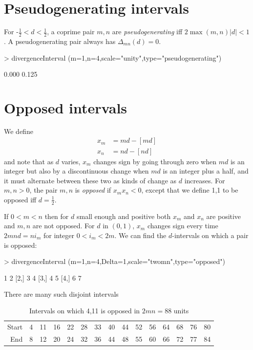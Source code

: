 \documentclass[a4paper]{article}
\newcommand{\half}{\textstyle{\frac{1}{2}}}
\begin{document}
\section{Pseudogenerating intervals}
For -$\half<d<\half$, a coprime pair $m,n$ are \emph{pseudogenerating} iff $2\max(m,n)|d|<1$. A pseudogenerating pair always has $\Delta_{mn}(d)=0$.
\begin{Schunk}
\begin{Sinput}
> divergenceInterval (m=1,n=4,scale="unity",type="pseudogenerating")
\end{Sinput}
\begin{Soutput}
[1] 0.000 0.125
\end{Soutput}
\end{Schunk}

\clearpage
\section{Opposed intervals}
We define
\begin{align*}
x_m &= m d - [ m d]
\\
x_n &= n d - [ n d ]
\end{align*}
and note that as $d$ varies, $x_m$ changes sign by going through zero when $md$ is an integer but also by a discontinuous change when $md$ is an integer plus a half, and it must alternate between these two as kinds of change as $d$ increases. For $m,n>0$, the pair $m,n$ is \emph{opposed} if $x_m x_n <0$, except that we define 1,1 to be opposed iff $d=\half$.

If $0<m<n$ then for $d$ small enough and positive both $x_m$ and $x_n$ are positive and $m,n$ are not opposed. For $d$ in $(0,1)$,
$x_m$ changes sign every time $2mnd=n i_m$ for integer $0<i_m<2m$.
We can find the $d$-intervals on which a pair is opposed:
\begin{Schunk}
\begin{Sinput}
> divergenceInterval (m=1,n=4,Delta=1,scale="twomn",type="opposed")
\end{Sinput}
\begin{Soutput}
     [,1] [,2]
[1,]    1    2
[2,]    3    4
[3,]    4    5
[4,]    6    7
\end{Soutput}
\end{Schunk}

There are many such disjoint intervals
\begin{table}[ht]
\centering
\begin{tabular}{rrrrrrrrrrrrrrr}
  \hline
  \hline
Start & 4 & 11 & 16 & 22 & 28 & 33 & 40 & 44 & 52 & 56 & 64 & 68 & 76 & 80 \\ 
  End & 8 & 12 & 20 & 24 & 32 & 36 & 44 & 48 & 55 & 60 & 66 & 72 & 77 & 84 \\ 
   \hline
\end{tabular}
\caption{Intervals on which 4,11 is opposed in $2mn=88$ units} 
\end{table}
\end{document}
